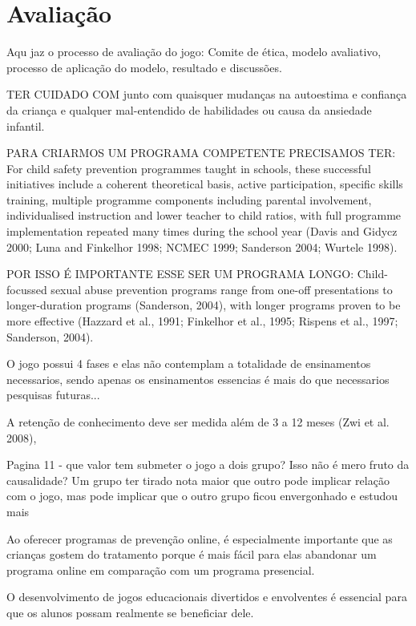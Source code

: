 \chapter{Avaliação}\label{ch:Avaliacao}

Aqu jaz o processo de avaliação do jogo:
Comite de ética, modelo avaliativo, processo de aplicação do modelo, resultado e discussões. 


TER CUIDADO COM junto com quaisquer mudanças na autoestima e confiança da criança e qualquer mal-entendido de habilidades ou causa da ansiedade infantil.


PARA CRIARMOS UM PROGRAMA COMPETENTE PRECISAMOS TER: For child safety prevention programmes taught in schools, these successful initiatives include a coherent theoretical basis, active participation, specific skills training, multiple programme components including parental involvement, individualised instruction and lower teacher to child ratios, with full programme implementation repeated many times during the school year (Davis and Gidycz 2000; Luna and Finkelhor 1998; NCMEC 1999; Sanderson 2004; Wurtele 1998).

POR ISSO É IMPORTANTE ESSE SER UM PROGRAMA LONGO: Child-focussed sexual abuse prevention programs range from one-off presentations to longer-duration programs (Sanderson, 2004), with longer programs proven to be more effective (Hazzard et al., 1991; Finkelhor et al., 1995; Rispens et al., 1997; Sanderson, 2004). %




O jogo possui 4 fases e elas não contemplam a totalidade de ensinamentos necessarios, sendo apenas os ensinamentos essencias é mais do que necessarios pesquisas futuras... 


A retenção de conhecimento deve ser medida além de 3 a 12 meses (Zwi et al. 2008),

Pagina 11 - que valor tem submeter o jogo a dois grupo? Isso não é mero fruto da causalidade? Um grupo ter tirado nota maior que outro pode implicar relação com o jogo, mas pode implicar que o outro grupo ficou envergonhado e estudou mais\cite{wazlawick2014metodologia}


Ao oferecer programas de prevenção online, é especialmente importante que as crianças gostem do tratamento porque é mais fácil para elas abandonar um programa online em comparação com um programa presencial. \cite{muller2014child}

O desenvolvimento de jogos educacionais divertidos e envolventes é essencial para que os alunos possam realmente se beneficiar dele.\cite{aslan2016digital}

